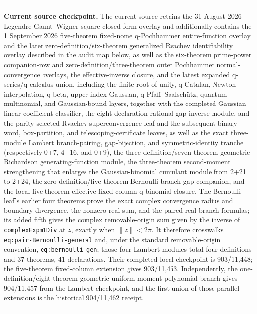 \documentclass[11pt,oneside]{article}
\theoremstyle{definition}
\theoremstyle{remark}
\newenvironment{boxedremark}{%
  \par\smallskip\noindent\begin{center}\begin{minipage}{0.94\textwidth}%
  \color{black}\hrule\vspace{0.6em}\small
}{%
  \vspace{0.6em}\hrule\end{minipage}\end{center}\smallskip
}
\begin{document}
\begin{boxedremark}
\textbf{Current source checkpoint.}
The current source retains the 31 August 2026 Legendre Gaunt--Wigner-square
closed-form overlay and additionally contains the 1 September 2026
five-theorem fixed-nome q-Pochhammer entire-function overlay and the later
zero-definition/six-theorem generalized Rvachev identifiability overlay
described in the audit map below, as well as the six-theorem prime-power
companion-row and zero-definition/three-theorem outer Pochhammer
normal-convergence overlays, the effective-inverse closure, and the latest
expanded q-series/q-calculus union, including the finite root-of-unity,
q-Catalan, Newton-interpolation, q-beta, upper-index Gaussian,
q-Pfaff--Saalsch\"utz, quantum-multinomial, and Gaussian-bound layers, together
with the completed Gaussian linear-coefficient classifier, the
eight-declaration rational-gap inverse module, and the parity-selected Rvachev
superconvergence leaf and the subsequent binary-word, box-partition, and
telescoping-certificate leaves, as well as the exact three-module Lambert
branch-pairing, gap-bijection, and symmetric-identity tranche (respectively
0+7, 4+16, and 0+9), the three-definition/seven-theorem geometric Richardson
generating-function module, the three-theorem second-moment strengthening that
enlarges the Gaussian-binomial cumulant module from 2+21 to 2+24, the
zero-definition/five-theorem Bernoulli branch-gap companion, and the local
five-theorem effective fixed-column q-binomial closure.  The Bernoulli leaf's earlier four
theorems prove the exact complex convergence radius and boundary divergence,
the nonzero-real sum, and the paired real branch formulas; its added fifth gives the
complex removable-origin sum given by the inverse of
\nolinkurl{complexExpm1Div} at \(z\), exactly when
\(\lVert z\rVert<2\pi\).  It therefore crosswalks
\nolinkurl{eq:pair-Bernoulli-general} and, under the standard removable-origin
convention, \nolinkurl{eq:bernoulli-gen}; those four Lambert modules total four
definitions and 37 theorems, 41 declarations.  Their completed local
checkpoint is 903/11,448; the five-theorem fixed-column extension gives
903/11,453.  Independently, the one-definition/eight-theorem geometric-uniform
moment-polynomial branch gives 904/11,457 from the Lambert checkpoint, and the
first union of those parallel extensions is the historical 904/11,462 receipt.
\end{boxedremark}
\end{document}
